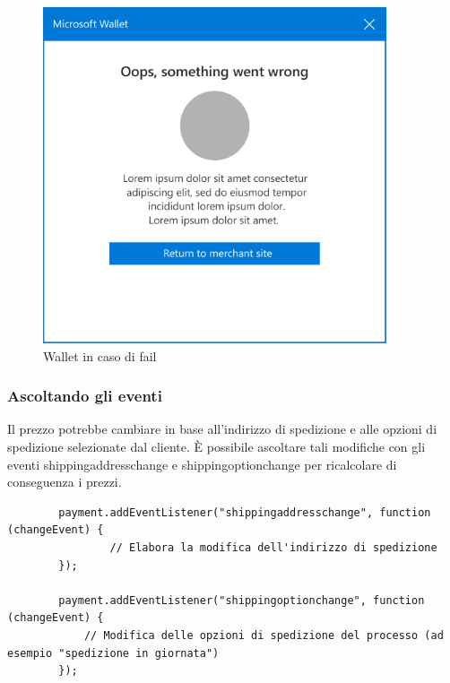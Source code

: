 \documentclass[italian]{article}
\begin{document}
	\begin{figure}
		\centering
		\includegraphics[width=1\linewidth]{wallet3}
		\caption{Wallet in caso di fail}
		\label{fig: Wallet in caso di fail}
	\end{figure}


	\subsubsection{Ascoltando gli eventi}
	Il prezzo potrebbe cambiare in base all'indirizzo di spedizione e alle opzioni di spedizione selezionate dal cliente. È possibile ascoltare tali modifiche con gli eventi shippingaddresschange e shippingoptionchange per ricalcolare di conseguenza i prezzi.
	\begin{lstlisting}
		payment.addEventListener("shippingaddresschange", function (changeEvent) {
			    // Elabora la modifica dell'indirizzo di spedizione
		});
		
		payment.addEventListener("shippingoptionchange", function (changeEvent) {
			// Modifica delle opzioni di spedizione del processo (ad esempio "spedizione in giornata")
		});
	\end{lstlisting}
	
\end{document}
